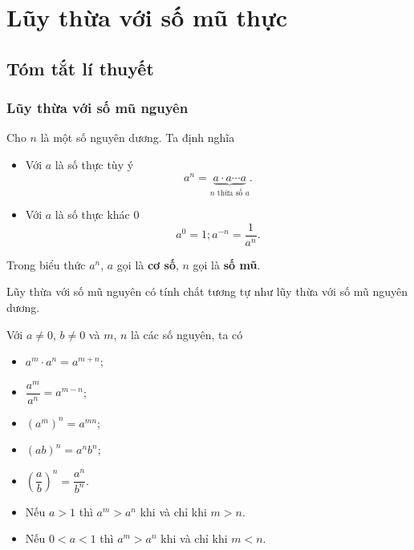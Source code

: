 \section{Lũy thừa với số mũ thực}
\subsection{Tóm tắt lí thuyết}
\begin{tomtat}
\subsubsection{Lũy thừa với số mũ nguyên}
\begin{dn}
	Cho $n$ là một số nguyên dương. Ta định nghĩa
	\begin{itemize}
		\item Với $a$ là số thực tùy ý $$a^n=\underbrace{a\cdot a \cdots a}_{n \text { thừa số } a}.$$
		\item Với $a$ là số thực khác $0$ $$a^0=1; a^{-n}=\dfrac{1}{a^n}.$$
	\end{itemize}
	Trong biểu thức $a^n$, $a$ gọi là \textbf{cơ số}, $n$ gọi là \textbf{số mũ}.
\end{dn}
Lũy thừa với số mũ nguyên có tính chất tương tự như lũy thừa với số mũ nguyên dương.
\begin{tc}
	Với $a\ne 0$, $b\ne 0$ và $m$, $n$ là các số nguyên, ta có
	\begin{multicols}{2}
		\begin{itemize}
			\item $a^m\cdot a^n=a^{m+n}$;
			\item $\dfrac{a^m}{a^n}=a^{m-n}$;
			\item $(a^m)^n=a^{mn}$;
			\item $(ab)^n=a^nb^n$;
			\item $\left(\dfrac{a}{b}\right)^n=\dfrac{a^n}{b^n}$.
		\end{itemize}
	\end{multicols}
\end{tc}
\begin{note}
	\begin{itemize}
		\item Nếu $a>1$ thì $a^m>a^n$ khi và chỉ khi $m>n$.
		\item Nếu $0<a<1$ thì $a^m>a^n$ khi và chỉ khi $m<n$.
	\end{itemize}
\end{note}

\end{tomtat}
